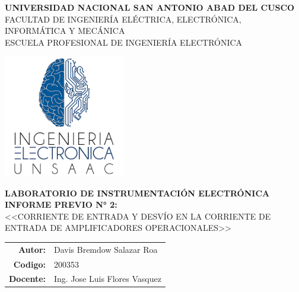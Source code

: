 \begin{titlepage}

  \begin{center}
    \Large{\textbf{UNIVERSIDAD NACIONAL SAN ANTONIO ABAD DEL CUSCO}} \\ 
    \vspace{0.4cm}
    \large{FACULTAD DE INGENIER\'IA EL\'ECTRICA, ELECTR\'ONICA, INFORM\'ATICA Y MEC\'ANICA}\ \\ 
    \vspace{0.1cm} 
    \large{ESCUELA PROFESIONAL DE INGENIER\'IA ELECTR\'ONICA}\ \\ 
	
    \vspace{1.0cm}    
    
    \includegraphics[width=0.4\textwidth]{images/LI-UNSAAC.png} \\


    \vspace{0.8cm}

    \large{\textbf{\textsc{LABORATORIO DE INSTRUMENTACIÓN ELECTR\'ONICA}}} \\
    \vspace{0.2cm}
    \large{\textbf{\textsc{INFORME PREVIO N° 2:}}} \\ 
    
    
    \vspace{0.5cm}
    \large{ \textsc{<<CORRIENTE DE ENTRADA Y DESVÍO EN LA CORRIENTE DE ENTRADA DE AMPLIFICADORES OPERACIONALES>>}} \\
    \vspace{1.0cm}
    
    \begin{table}[H]
    	\centering
    	\begin{tabular}{rl}
    		\large{\textbf{Autor:}}   & \large{Davis Bremdow Salazar Roa}  \\
    		\large{\textbf{Codigo:}}   & \large{200353}  \\
    		\large{\textbf{Docente:}} & \large{Ing. Jose Luis Flores Vasquez}
    	\end{tabular}
    \end{table}


\end{center}
\end{titlepage}

